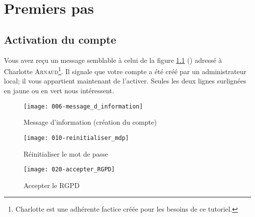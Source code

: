 \chapter{Premiers pas}\label{chap:premiersPas}



\section{Activation du compte}

Vous avez reçu un message semblable à celui de la figure \ref{fig:messageInformation} () adressé à Charlotte \textsc{Arnaud}\footnote{Charlotte est une adhérente factice créée pour les besoins de ce tutoriel.}.
Il signale que votre compte a été créé par un administrateur local; il vous appartient maintenant de l’activer.
Seules les deux lignes surlignées en jaune ou en vert nous intéressent.
\begin{figure}
    \texttt{[image: 006-message\_d\_information]}
    \caption{Message d'information (création du compte)}
    \label{fig:messageInformation}
\end{figure}
\begin{figure}
    \texttt{[image: 010-reinitialiser\_mdp]}
    \caption{Réinitialiser le mot de passe}
    \label{fig:reinitialiserMdp}
\end{figure}
\begin{figure}
    \texttt{[image: 020-accepter\_RGPD]}
    \caption{Accepter le RGPD}
    \label{fig:accepterRgpd}
\end{figure}
